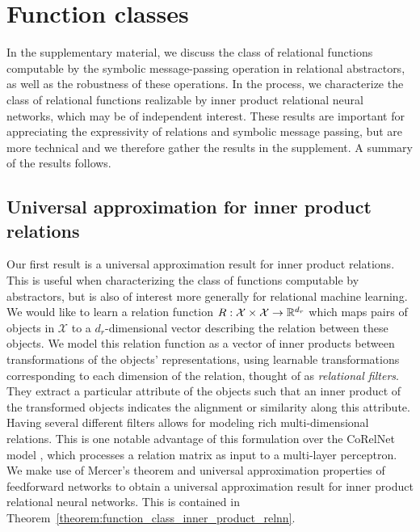 \section{Function classes}
\label{ssec:function_classes}

In the supplementary material, we discuss the class of relational functions computable by the symbolic message-passing operation in relational abstractors, as well as the robustness of these operations. In the process, we characterize the class of relational functions realizable by inner product relational neural networks, which may be of independent interest. These results are important for appreciating the expressivity of relations and symbolic message passing, but are more technical and we therefore gather the results in the supplement. A summary of the results follows.


\def\rdot{\bigcdot}
\def\F{{\mathfrak{F}}}
\def\MLP{\text{MLP}}

\subsection{Universal approximation for inner product relations}

Our first result is a universal approximation result for inner product relations. This is useful when characterizing the class of functions computable by abstractors, but is also of interest more generally for relational machine learning.
We would like to learn a relation function \(R: \mathcal{X} \times \mathcal{X} \to \mathbb{R}^{d_r}\) which maps pairs of objects in \(\mathcal{X}\) to a \(d_r\)-dimensional vector describing the relation between these objects. We model this relation function as a vector of inner products between transformations of the objects' representations,
using learnable transformations corresponding to each dimension of the relation, thought of as \textit{relational filters}. They extract a particular attribute of the objects such that an inner product of the transformed objects indicates the alignment or similarity along this attribute. Having several different filters allows for modeling rich multi-dimensional relations. This is one notable advantage of this formulation over the CoRelNet model \citep{kerg2022neural}, which processes a relation matrix as input to a multi-layer perceptron.
We make use of Mercer's theorem and universal approximation properties of feedforward networks to obtain a universal approximation result for inner product relational neural networks. This is contained in Theorem~\ref{theorem:function_class_inner_product_relnn}.

